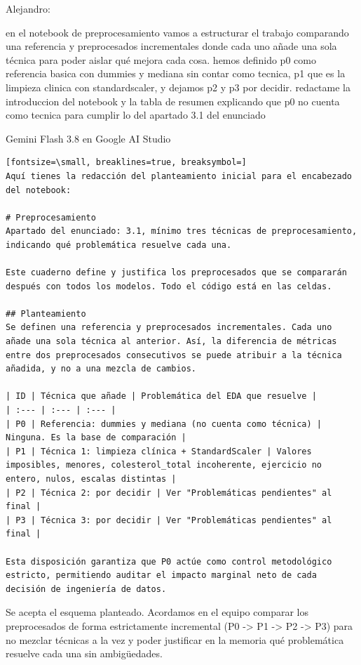 \documentclass[12pt,a4paper,oneside]{book}
\begin{document}
Alejandro:


\begin{iaprompt}
en el notebook de preprocesamiento vamos a estructurar el trabajo comparando una referencia y preprocesados incrementales donde cada uno añade una sola técnica para poder aislar qué mejora cada cosa. hemos definido p0 como referencia basica con dummies y mediana sin contar como tecnica, p1 que es la limpieza clinica con standardscaler, y dejamos p2 y p3 por decidir. redactame la introduccion del notebook y la tabla de resumen explicando que p0 no cuenta como tecnica para cumplir lo del apartado 3.1 del enunciado
\end{iaprompt}
\begin{iaresp}{Gemini Flash 3.8 en Google AI Studio}
\begin{Verbatim}[fontsize=\small, breaklines=true, breaksymbol=]
Aquí tienes la redacción del planteamiento inicial para el encabezado del notebook:

# Preprocesamiento
Apartado del enunciado: 3.1, mínimo tres técnicas de preprocesamiento, indicando qué problemática resuelve cada una.

Este cuaderno define y justifica los preprocesados que se compararán después con todos los modelos. Todo el código está en las celdas.

## Planteamiento
Se definen una referencia y preprocesados incrementales. Cada uno añade una sola técnica al anterior. Así, la diferencia de métricas entre dos preprocesados consecutivos se puede atribuir a la técnica añadida, y no a una mezcla de cambios.

| ID | Técnica que añade | Problemática del EDA que resuelve |
| :--- | :--- | :--- |
| P0 | Referencia: dummies y mediana (no cuenta como técnica) | Ninguna. Es la base de comparación |
| P1 | Técnica 1: limpieza clínica + StandardScaler | Valores imposibles, menores, colesterol_total incoherente, ejercicio no entero, nulos, escalas distintas |
| P2 | Técnica 2: por decidir | Ver "Problemáticas pendientes" al final |
| P3 | Técnica 3: por decidir | Ver "Problemáticas pendientes" al final |

Esta disposición garantiza que P0 actúe como control metodológico estricto, permitiendo auditar el impacto marginal neto de cada decisión de ingeniería de datos.
\end{Verbatim}
\end{iaresp}
\begin{iaanalisis}
Se acepta el esquema planteado. Acordamos en el equipo comparar los preprocesados de forma estrictamente incremental (P0 -> P1 -> P2 -> P3) para no mezclar técnicas a la vez y poder justificar en la memoria qué problemática resuelve cada una sin ambigüedades.
\end{iaanalisis}
\end{document}
